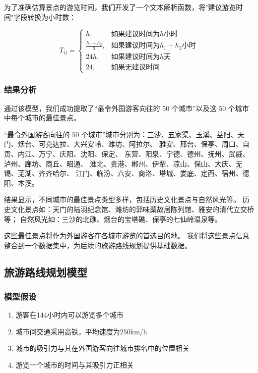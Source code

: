 \documentclass[withoutpreface,bwprint]{cumcmthesis} %
\begin{document}
为了准确估算景点的游览时间，我们开发了一个文本解析函数，将"建议游览时间"字段转换为小时数：

\begin{equation}
T_{ij} = \begin{cases}
h, & \text{如果建议时间为$h$小时} \\
\frac{h_1 + h_2}{2}, & \text{如果建议时间为$h_1-h_2$小时} \\
24h, & \text{如果建议时间为$h$天} \\
24, & \text{如果无建议时间}
\end{cases}
\end{equation}

\subsubsection{结果分析}
通过该模型，我们成功提取了“最令外国游客向往的 50 个城市”以及这 50 个城市中每个城市的最佳景点。

“最令外国游客向往的 50 个城市”城市分别为：三沙、五家渠、玉溪、益阳、天门、烟台、可克达拉、大兴安岭、潍坊、阿拉尔、
雅安、邢台、保亭、周口、自贡、内江、万宁、庆阳、沈阳、保定、
东营、阳泉、宁德、德州、抚州、武威、泸州、廊坊、商丘、昭通、
淮北、贵港、郴州、伊犁、凉山、保山、大庆、无锡、芜湖、齐齐哈尔、
江门、临汾、六安、商洛、塔城、娄底、定西、宿州、德阳、本溪。

结果显示，不同城市的最佳景点类型多样，包括历史文化景点与自然风光等。
历史文化景点如：天门的陆羽纪念馆、潍坊的郭味蕖故居陈列馆、雅安的清代立交桥等；
自然风光如：三沙的北礁、烟台的宝塔礁、保亭的七仙岭温泉等。

这些最佳景点将作为外国游客在各城市游览的首选目的地。
我们将这些景点信息整合到一个数据集中，为后续的旅游路线规划提供基础数据。


\subsection{旅游路线规划模型}

\subsubsection{模型假设}
\begin{enumerate}
    \item 游客在144小时内可以游览多个城市
    \item 城市间交通采用高铁，平均速度为250km/h
    \item 城市的吸引力与其在外国游客向往城市排名中的位置相关
    \item 游览一个城市的时间与其吸引力正相关
\end{enumerate}
\end{document}
